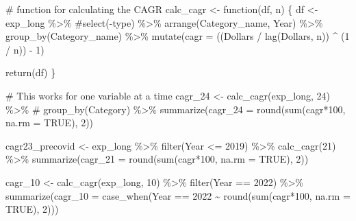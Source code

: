 \documentclass[
  letterpaper,
  DIV=11,
  numbers=noendperiod]{scrreport}
\newenvironment{Shaded}{\begin{snugshade}}{\end{snugshade}}
\newcommand{\AttributeTok}[1]{\textcolor[rgb]{0.40,0.45,0.13}{#1}}
\newcommand{\CommentTok}[1]{\textcolor[rgb]{0.37,0.37,0.37}{#1}}
\newcommand{\ConstantTok}[1]{\textcolor[rgb]{0.56,0.35,0.01}{#1}}
\newcommand{\ControlFlowTok}[1]{\textcolor[rgb]{0.00,0.23,0.31}{#1}}
\newcommand{\DecValTok}[1]{\textcolor[rgb]{0.68,0.00,0.00}{#1}}
\newcommand{\FunctionTok}[1]{\textcolor[rgb]{0.28,0.35,0.67}{#1}}
\newcommand{\NormalTok}[1]{\textcolor[rgb]{0.00,0.23,0.31}{#1}}
\newcommand{\OtherTok}[1]{\textcolor[rgb]{0.00,0.23,0.31}{#1}}
\newcommand{\SpecialCharTok}[1]{\textcolor[rgb]{0.37,0.37,0.37}{#1}}
\newcommand{\StringTok}[1]{\textcolor[rgb]{0.13,0.47,0.30}{#1}}
\begin{document}
\begin{Shaded}
\begin{Highlighting}[]
\CommentTok{\# function for calculating the CAGR}
\NormalTok{calc\_cagr }\OtherTok{\textless{}{-}} \ControlFlowTok{function}\NormalTok{(df, n) \{}
\NormalTok{  df }\OtherTok{\textless{}{-}}\NormalTok{ exp\_long }\SpecialCharTok{\%\textgreater{}\%}
    \CommentTok{\#select({-}type) \%\textgreater{}\%}
    \FunctionTok{arrange}\NormalTok{(Category\_name, Year) }\SpecialCharTok{\%\textgreater{}\%}
    \FunctionTok{group\_by}\NormalTok{(Category\_name) }\SpecialCharTok{\%\textgreater{}\%}
    \FunctionTok{mutate}\NormalTok{(}\AttributeTok{cagr =}\NormalTok{ ((}\StringTok{\textasciigrave{}}\AttributeTok{Dollars}\StringTok{\textasciigrave{}} \SpecialCharTok{/} \FunctionTok{lag}\NormalTok{(}\StringTok{\textasciigrave{}}\AttributeTok{Dollars}\StringTok{\textasciigrave{}}\NormalTok{, n)) }\SpecialCharTok{\^{}}\NormalTok{ (}\DecValTok{1} \SpecialCharTok{/}\NormalTok{ n)) }\SpecialCharTok{{-}} \DecValTok{1}\NormalTok{)}

  \FunctionTok{return}\NormalTok{(df)}
\NormalTok{\}}

\CommentTok{\# This works for one variable at a time}
\NormalTok{cagr\_24 }\OtherTok{\textless{}{-}} \FunctionTok{calc\_cagr}\NormalTok{(exp\_long, }\DecValTok{24}\NormalTok{) }\SpecialCharTok{\%\textgreater{}\%} 
  \CommentTok{\# group\_by(Category) \%\textgreater{}\%}
  \FunctionTok{summarize}\NormalTok{(}\AttributeTok{cagr\_24 =} \FunctionTok{round}\NormalTok{(}\FunctionTok{sum}\NormalTok{(cagr}\SpecialCharTok{*}\DecValTok{100}\NormalTok{, }\AttributeTok{na.rm =} \ConstantTok{TRUE}\NormalTok{), }\DecValTok{2}\NormalTok{))}

\NormalTok{cagr23\_precovid }\OtherTok{\textless{}{-}}\NormalTok{ exp\_long }\SpecialCharTok{\%\textgreater{}\%}
  \FunctionTok{filter}\NormalTok{(Year }\SpecialCharTok{\textless{}=} \DecValTok{2019}\NormalTok{) }\SpecialCharTok{\%\textgreater{}\%}
  \FunctionTok{calc\_cagr}\NormalTok{(}\DecValTok{21}\NormalTok{) }\SpecialCharTok{\%\textgreater{}\%} 
  \FunctionTok{summarize}\NormalTok{(}\AttributeTok{cagr\_21 =} \FunctionTok{round}\NormalTok{(}\FunctionTok{sum}\NormalTok{(cagr}\SpecialCharTok{*}\DecValTok{100}\NormalTok{, }\AttributeTok{na.rm =} \ConstantTok{TRUE}\NormalTok{), }\DecValTok{2}\NormalTok{))}



\NormalTok{cagr\_10 }\OtherTok{\textless{}{-}} \FunctionTok{calc\_cagr}\NormalTok{(exp\_long, }\DecValTok{10}\NormalTok{) }\SpecialCharTok{\%\textgreater{}\%} 
  \FunctionTok{filter}\NormalTok{(Year }\SpecialCharTok{==} \DecValTok{2022}\NormalTok{) }\SpecialCharTok{\%\textgreater{}\%}
  \FunctionTok{summarize}\NormalTok{(}\AttributeTok{cagr\_10 =} \FunctionTok{case\_when}\NormalTok{(Year }\SpecialCharTok{==} \DecValTok{2022} \SpecialCharTok{\textasciitilde{}} \FunctionTok{round}\NormalTok{(}\FunctionTok{sum}\NormalTok{(cagr}\SpecialCharTok{*}\DecValTok{100}\NormalTok{, }\AttributeTok{na.rm =} \ConstantTok{TRUE}\NormalTok{), }\DecValTok{2}\NormalTok{)))}


\end{Highlighting}
\end{Shaded}
\end{document}
